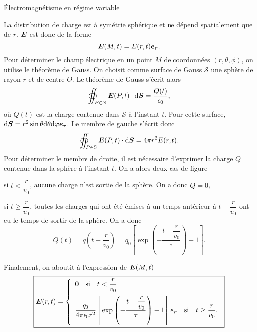 \begin{corr}{Électromagnétisme en régime variable}

	\begin{corrlist}
		\item La distribution de charge est à symétrie sphérique et 
		  ne dépend spatialement que de $r$. $\vece$ est donc de la forme
		  \begin{equation*}
			  \vece(M, t) = E(r, t)\er.
		  \end{equation*}
		  Pour déterminer le champ électrique en un point $M$ de 
		  coordonnées $(r, \theta, \phi)$, on utilise le théorème de 
		  Gauss. On choisit comme surface de Gauss $\mathcal{S}$ une sphère de 
		  rayon $r$ et de centre $O$. Le théorème de Gauss s'écrit alors
		  \begin{equation*}
			  \oiint_{P \in \mathcal{S}} \vece(P, t) \cdot \ds 
			  = \dfrac{Q(t)}{\epsilon_0},
		  \end{equation*}
		  où $Q(t)$ est la charge contenue dans $\mathcal{S}$ à l'instant
		  $t$. Pour cette surface, $\ds = r^2 \sin \theta \dtheta \dphi \er$.
		  Le membre de gauche s'écrit donc
		  \begin{equation*}
			  \oiint_{P \in \mathrm{S}} \vece(P, t) \cdot \ds =
			  4 \pi r^2 E(r, t).
		  \end{equation*}
		  Pour déterminer le membre de droite, il est nécessaire d'exprimer
		  la charge $Q$ contenue dans la sphère à l'instant $t$. On a
		  alors deux cas de figure
		  \begin{corrlist}
			  \item si $t < \dfrac{r}{v_0}$, aucune charge n'est 
			    sortie de la sphère. On a donc $Q = 0$,
			  \item si $t \ge \dfrac{r}{v_0}$, toutes les charges
		            qui ont été émises à un temps antérieur à $t -
			    \dfrac{r}{v_0}$ ont eu le temps de sortir de la sphère.
			    On a donc
			    \begin{equation*}
				    Q(t) = q\left(t - \dfrac{r}{v_0} \right)
				      = q_0 \left[\exp\left(- \dfrac{t - 
					      \dfrac{r}{v_0}}{\tau}\right) - 1
					   \right].
			   \end{equation*}
		  \end{corrlist}
		  Finalement, on aboutit à l'expression de $\vece(M, t)$
		  \begin{equation*}
			  \boxed{
			  \vece(r, t) =
			  \left\{
			  \begin{array}{l}
				  \vec{0} \quad \mathrm{si} \quad t < 
				  \dfrac{r}{v_0} \\[1em]
				  \dfrac{q_0}{4 \pi \epsilon_0 r^2}
				  \left[\exp\left(- \dfrac{t - 
			          \dfrac{r}{v_0}}{\tau}\right) - 1 \right]\er
				  \quad \mathrm{si} \quad t \ge \dfrac{r}{v_0}.
		         \end{array}
			 \right.
		 }
		\end{equation*}


\end{corrlist}
\end{corr}
